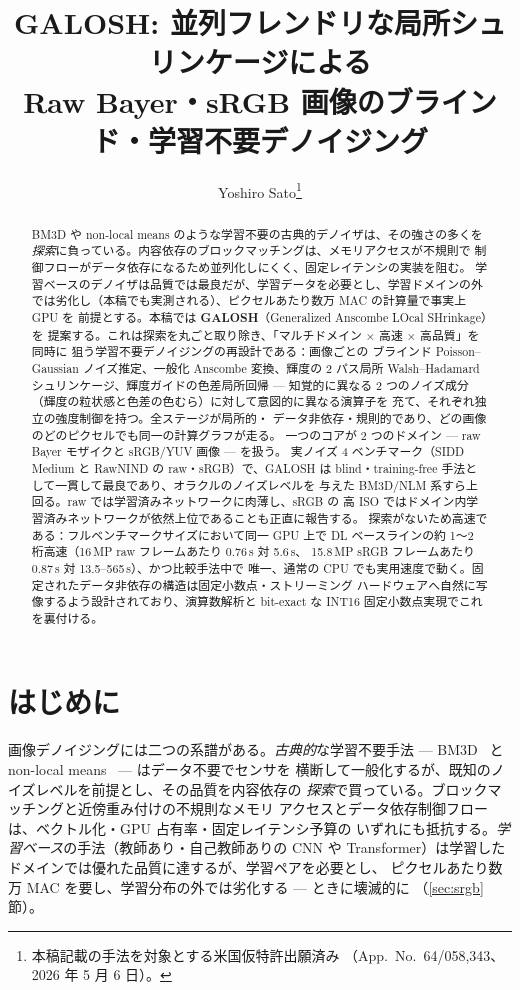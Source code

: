 \documentclass[10pt,twocolumn]{article}
\title{\textbf{GALOSH: 並列フレンドリな局所シュリンケージによる\\
Raw Bayer・sRGB 画像のブラインド・学習不要デノイジング}}
\author{Yoshiro Sato\thanks{本稿記載の手法を対象とする米国仮特許出願済み
（App.\ No.\ 64/058,343、2026 年 5 月 6 日）。}}
\date{}
\begin{document}
\maketitle

\begin{abstract}
BM3D や non-local means のような学習不要の古典的デノイザは、その強さの多くを
\emph{探索}に負っている。内容依存のブロックマッチングは、メモリアクセスが不規則で
制御フローがデータ依存になるため並列化しにくく、固定レイテンシの実装を阻む。
学習ベースのデノイザは品質では最良だが、学習データを必要とし、学習ドメインの外
では劣化し（本稿でも実測される）、ピクセルあたり数万 MAC の計算量で事実上 GPU を
前提とする。本稿では \textbf{GALOSH}（Generalized Anscombe LOcal SHrinkage）を
提案する。これは探索を丸ごと取り除き、「マルチドメイン × 高速 × 高品質」を同時に
狙う学習不要デノイジングの再設計である：画像ごとの
ブラインド Poisson--Gaussian ノイズ推定、一般化 Anscombe 変換、輝度の 2 パス局所
Walsh--Hadamard シュリンケージ、輝度ガイドの色差局所回帰 --- 知覚的に異なる
2 つのノイズ成分（輝度の粒状感と色差の色むら）に対して意図的に異なる演算子を
充て、それぞれ独立の強度制御を持つ。全ステージが局所的・
データ非依存・規則的であり、どの画像のどのピクセルでも同一の計算グラフが走る。
一つのコアが 2 つのドメイン --- raw Bayer モザイクと sRGB/YUV 画像 --- を扱う。
実ノイズ 4 ベンチマーク（SIDD Medium と RawNIND の raw・sRGB）で、GALOSH は
blind・training-free 手法として一貫して最良であり、オラクルのノイズレベルを
与えた BM3D/NLM 系すら上回る。raw では学習済みネットワークに肉薄し、sRGB の
高 ISO ではドメイン内学習済みネットワークが依然上位であることも正直に報告する。
探索がないため高速である：フルベンチマークサイズにおいて同一 GPU 上で DL
ベースラインの約 1〜2 桁高速（16\,MP raw フレームあたり 0.76\,s 対 5.6\,s、
15.8\,MP sRGB フレームあたり 0.87\,s 対 13.5--565\,s）、かつ比較手法中で
唯一、通常の CPU でも実用速度で動く。固定されたデータ非依存の構造は固定小数点・ストリーミング
ハードウェアへ自然に写像するよう設計されており、演算数解析と bit-exact な INT16
固定小数点実現でこれを裏付ける。
\end{abstract}

\section{はじめに}
画像デノイジングには二つの系譜がある。\emph{古典的}な学習不要手法 ---
BM3D~\cite{bm3d} と non-local means~\cite{nlm} --- はデータ不要でセンサを
横断して一般化するが、既知のノイズレベルを前提とし、その品質を内容依存の
\emph{探索}で買っている。ブロックマッチングと近傍重み付けの不規則なメモリ
アクセスとデータ依存制御フローは、ベクトル化・GPU 占有率・固定レイテンシ予算の
いずれにも抵抗する。\emph{学習ベース}の手法（教師あり・自己教師ありの CNN や
Transformer）は学習したドメインでは優れた品質に達するが、学習ペアを必要とし、
ピクセルあたり数万 MAC を要し、学習分布の外では劣化する --- ときに壊滅的に
（\ref{sec:srgb}節）。
\end{document}
